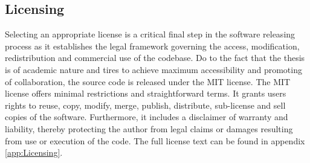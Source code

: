 \subsection{Licensing}
Selecting an appropriate license is a critical final step in the software releasing process as it establishes the legal framework governing the access, modification, redistribution and commercial use of the codebase. Do to the fact that the thesis is of academic nature and tires to achieve maximum accessibility and promoting of collaboration, the source code is released under the MIT license. The MIT license offers minimal restrictions and straightforward terms. It grants users rights to reuse, copy, modify, merge, publish, distribute, sub-license and sell copies of the software. Furthermore, it includes a disclaimer of warranty and liability, thereby protecting the author from legal claims or damages resulting from use or execution of the code. The full license text can be found in appendix \ref{app:Licensing}.  